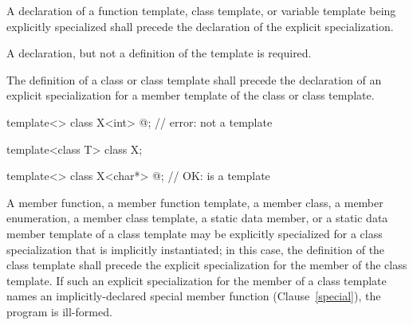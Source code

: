 \pnum
A declaration of a function template, class template, or variable template being explicitly
specialized shall precede the declaration of
the explicit
specialization.
\begin{note}
A declaration, but not a definition of the template is required.
\end{note}
The definition of a class or class template shall precede the
declaration of an explicit specialization for a member template of the class
or class template.
\begin{example}

\begin{codeblock}
template<> class X<int> { @\commentellip@ };          // error:  not a template

template<class T> class X;

template<> class X<char*> { @\commentellip@ };        // OK:  is a template
\end{codeblock}
\end{example}

\pnum
A member function, a member function template, a member class,
a member enumeration, a
member class template,
a static data member, or a static data member template of a class template
may be explicitly specialized for a class specialization that is implicitly
instantiated;
in this case, the definition of the class template shall
precede the explicit specialization for the member of the class
template.
If such an explicit specialization for the member of a class template names an
implicitly-declared special member function (Clause~\ref{special}),
the program is ill-formed.

